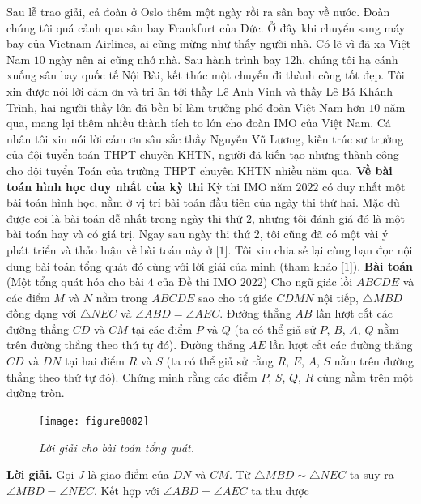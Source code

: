 \begin{multicols}{2}
	\vskip 0.05cm
	Sau lễ trao giải, cả đoàn ở Oslo thêm một ngày rồi ra sân bay về nước. Đoàn chúng tôi quá cảnh qua sân bay Frankfurt của Đức. Ở đây khi chuyển sang máy bay của Vietnam Airlines, ai cũng mừng như thấy người nhà. Có lẽ vì đã xa Việt Nam $10$ ngày nên ai cũng nhớ nhà. Sau hành trình bay $12$h, chúng tôi hạ cánh xuống sân bay quốc tế Nội Bài, kết thúc một chuyến đi thành công tốt đẹp.
	\vskip 0.05cm
	Tôi xin được nói lời cảm ơn và tri ân tới thầy Lê Anh Vinh và thầy Lê Bá Khánh Trình, hai người thầy lớn đã bền bỉ làm trưởng phó đoàn Việt Nam hơn $10$ năm qua, mang lại thêm nhiều thành tích to lớn cho đoàn IMO của Việt Nam. Cá nhân tôi xin nói lời cảm ơn sâu sắc thầy Nguyễn Vũ Lương, kiến trúc sư trưởng của đội tuyển toán THPT chuyên KHTN, người đã kiến tạo những thành công cho đội tuyển Toán của trường THPT chuyên KHTN nhiều năm qua.
	\vskip 0.05cm
	{\bf\color{cackithi}Về bài toán hình học duy nhất của kỳ thi}
	\vskip 0.05cm 
	Kỳ thi IMO năm $2022$ có duy nhất một bài toán hình học, nằm ở vị trí bài toán đầu tiên của ngày thi thứ hai. Mặc dù được coi là bài toán dễ nhất trong ngày thi thứ $2$, nhưng tôi đánh giá đó là một bài toán hay và có giá trị. Ngay sau ngày thi thứ $2$, tôi cũng đã có một vài ý phát triển và thảo luận về bài toán này ở [$1$]. Tôi xin chia sẻ lại cùng bạn đọc nội dung bài toán tổng quát đó cùng với lời giải của mình (tham khảo [$1$]).
	\vskip 0.05cm
	\textbf{\color{cackithi}Bài toán} (Một tổng quát hóa cho bài $4$ của Đề thi IMO $2022$) Cho ngũ giác lồi $ABCDE$ và các điểm $M$ và $N$ nằm trong $ABCDE$ sao cho tứ giác $CDMN$ nội tiếp, $\triangle MBD$ đồng dạng với $\triangle NEC$ và $\angle ABD=\angle AEC$. Đường thẳng $AB$ lần lượt cắt các đường thẳng $CD$ và $CM$ tại các điểm $P$ và $Q$ (ta có thể giả sử $P$, $B$, $A$, $Q$ nằm trên đường thẳng theo thứ tự đó). Đường thẳng $AE$ lần lượt cắt các đường thẳng $CD$ và $DN$ tại hai điểm $R$ và $S$ (ta có thể giả sử rằng $R$, $E$, $A$, $S$ nằm trên đường thẳng theo thứ tự đó). Chứng minh rằng các điểm $P$, $S$, $Q$, $R$ cùng nằm trên một đường tròn.
	\begin{figure}[H]
		\vspace*{-5pt}
		\centering
		\captionsetup{labelformat= empty, justification=centering}
		\texttt{[image: figure8082]}
		\caption{\small\textit{\color{cackithi}Lời giải cho bài toán tổng quát.}}
		\vspace*{-10pt}
	\end{figure}
	\setlength{\abovedisplayskip}{6pt}
	\setlength{\belowdisplayskip}{6pt}
	\textbf{\color{cackithi}Lời giải.} Gọi $J$ là giao điểm của $DN$ và $CM$. Từ $\triangle MBD\sim\triangle NEC$ ta suy ra $\angle MBD=\angle NEC$. Kết hợp với $\angle ABD=\angle AEC$ ta thu được 

\end{multicols}
